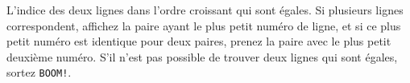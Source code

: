 \begin{Output}
    L'indice des deux lignes dans l'ordre croissant qui sont égales. Si plusieurs lignes correspondent, affichez la paire ayant le plus petit numéro de ligne, et si ce plus petit numéro est identique pour deux paires, prenez la paire avec le plus petit deuxième numéro. S'il n'est pas possible de trouver deux lignes qui sont égales, sortez \texttt{BOOM!}.
\end{Output}
